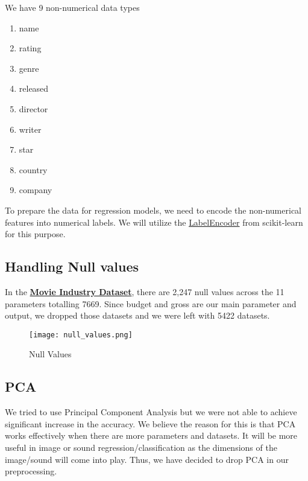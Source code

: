 \documentclass[conference]{IEEEtran}
\begin{document}
        We have 9 non-numerical data types
        \begin{enumerate}
            \item name
            \item rating
            \item genre
            \item released
            \item director
            \item writer
            \item star
            \item country
            \item company
        \end{enumerate}
        
        To prepare the data for regression models, we need to encode the non-numerical features into numerical labels. We will utilize the \href{https://scikit-learn.org/stable/modules/generated/sklearn.preprocessing.LabelEncoder.html}{LabelEncoder} from scikit-learn for this purpose.
       
        \subsection{Handling Null values}
            In the \href{https://www.kaggle.com/datasets/danielgrijalvas/movies}{\textbf{Movie Industry Dataset}}, there are 2,247 null values across the 11 parameters totalling 7669.
            Since budget and gross are our main parameter and output, we dropped those datasets and we were left with 5422 datasets.
            
            \begin{figure}
                \centering \texttt{[image: null\_values.png]}
                \caption{Null Values}
                \label{fig:null-values}
            \end{figure}
            
        \subsection{PCA}
            We tried to use Principal Component Analysis but we were not able to achieve significant increase in the accuracy.
            We believe the reason for this is that PCA works effectively when there are more parameters and datasets.
            It will be more useful in image or sound regression/classification as the dimensions of the image/sound will come into play.
            Thus, we have decided to drop PCA in our preprocessing.
            
\end{document}
